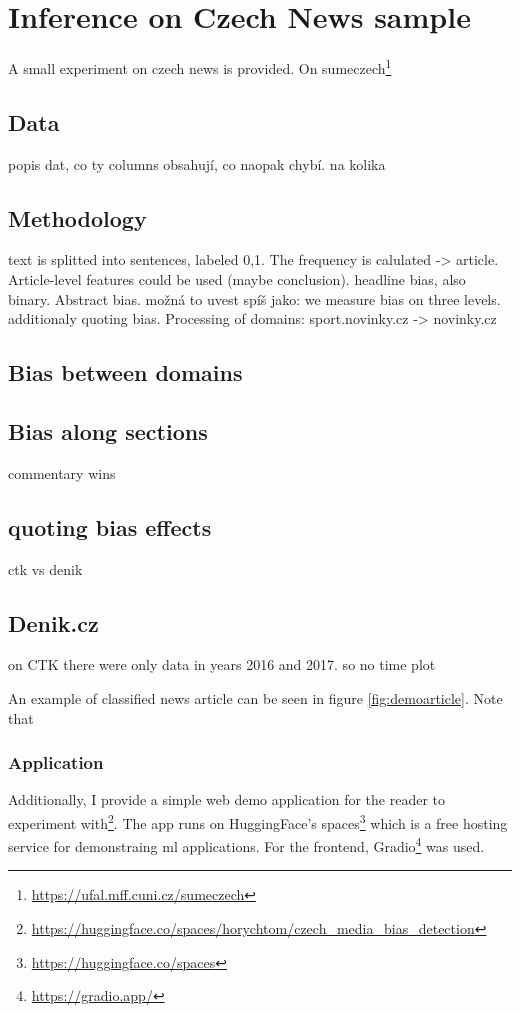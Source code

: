\chapter{Inference on Czech News sample}\label{inference}
A small experiment on czech news is provided. On sumeczech\footnote{\url{https://ufal.mff.cuni.cz/sumeczech}} \cite{straka2018sumeczech}



\section{Data}
popis dat, co ty columns obsahují, co naopak chybí. na kolika 

\section{Methodology}
text is splitted into sentences, labeled 0,1. The frequency is calulated -> article. Article-level features could be used (maybe conclusion). headline bias, also binary. Abstract bias. možná to uvest spíš jako: we measure bias on three levels. additionaly quoting bias.
Processing of domains: sport.novinky.cz -> novinky.cz


\section{Bias between domains}

\section{Bias along sections}
commentary wins

\section{quoting bias effects}
ctk vs denik

\section{Denik.cz}
on CTK there were only data in years 2016 and 2017. so no time plot

An example of classified news article can be seen in figure \ref{fig:demoarticle}. Note that 



\subsection{Application}
Additionally, I provide a simple web demo application for the reader to experiment with\footnote{\url{https://huggingface.co/spaces/horychtom/czech_media_bias_detection}}. The app runs on HuggingFace's spaces\footnote{\url{https://huggingface.co/spaces}} which is a free hosting service for demonstraing \gls{ml} applications. For the frontend, Gradio\footnote{\url{https://gradio.app/}} was used.

